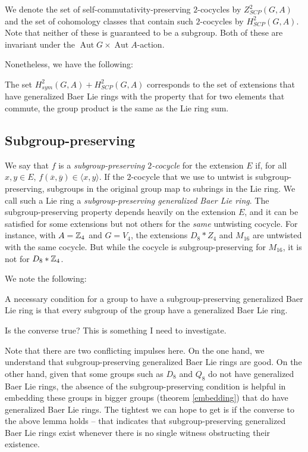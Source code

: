\documentclass[10pt]{amsart}
\newcommand{\Aut}{\operatorname{Aut}}
\begin{document}
We denote the set of self-commutativity-preserving $2$-cocycles by
$Z^2_{SCP}(G,A)$ and the set of cohomology classes that contain such
$2$-cocycles by $H^2_{SCP}(G,A)$. Note that neither of these is
guaranteed to be a subgroup. Both of these are invariant under the
$\Aut G \times \Aut A$-action.

Nonetheless, we have the following:

\begin{lemma}
  The set $H^2_{sym}(G,A) + H^2_{SCP}(G,A)$ corresponds to the set of
  extensions that have generalized Baer Lie rings with the property
  that for two elements that commute, the group product is the same as
  the Lie ring sum.
\end{lemma}

\subsection{Subgroup-preserving}

We say that $f$ is a {\em subgroup-preserving $2$-cocycle} for the
extension $E$ if, for all $x,y \in E$, $f(\overline{x},\overline{y})
\in \langle x,y \rangle$. If the $2$-cocycle that we use to untwist is
subgroup-preserving, subgroups in the original group map to subrings
in the Lie ring. We call such a Lie ring a {\em subgroup-preserving
generalized Baer Lie ring}. The subgroup-preserving property depends
heavily on the extension $E$, and it can be satisfied for some
extensions but not others for the {\em same} untwisting cocycle. For
instance, with $A = \mathbb{Z}_4$ and $G = V_4$, the extensions $D_8 * Z_4$
and $M_{16}$ are untwisted with the same cocycle. But while the
cocycle is subgroup-preserving for $M_{16}$, it is not for $D_8 *
\mathbb{Z}_4$.

We note the following:

\begin{lemma}
  A necessary condition for a group to have a subgroup-preserving
  generalized Baer Lie ring is that every subgroup of the group have a
  generalized Baer Lie ring.
\end{lemma}

Is the converse true? This is something I need to investigate.

Note that there are two conflicting impulses here. On the one hand, we
understand that subgroup-preserving generalized Baer Lie rings are
good. On the other hand, given that some groups such as $D_8$ and
$Q_8$ do not have generalized Baer Lie rings, the absence of the
subgroup-preserving condition is helpful in embedding these groups in
bigger groups (theorem \ref{embedding}) that do have generalized Baer
Lie rings. The tightest we can hope to get is if the converse to the
above lemma holds -- that indicates that subgroup-preserving
generalized Baer Lie rings exist whenever there is no single witness
obstructing their existence.
\end{document}
